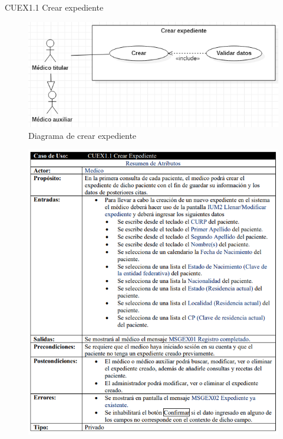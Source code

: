 \documentclass[12pt,letterpaper]{article}
\begin{document}
            \newpage
            CUEX1.1 Crear expediente
            \begin{figure}[H]
                \centering
                \includegraphics [scale=0.6]{casosUso/crearExpediente}
                \caption{Diagrama de crear expediente}
            \end{figure}
            \begin{figure}[H]
                \centering
                \includegraphics [scale=0.7]{specs/specCrearExpediente}
            \end{figure}
\end{document}
